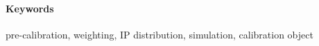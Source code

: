 \documentclass[a4paper, twocolumn, oneside]{article}
\title{\mytitle}
\author{John-John Markstedt}
\begin{document}
    \onecolumn
    \maketitle
    
    \vspace{-.1cm}
    \paragraph{Keywords}
    pre-calibration, weighting, IP distribution, simulation, calibration object

    \vspace{-.4cm}

    \newpage

    \setcounter{secnumdepth}{2}
    \setcounter{tocdepth}{2}
    \tableofcontents
    \thispagestyle{empty}
    \newpage
    \setcounter{page}{1}
    \setcounter{section}{0}

    \twocolumn

    

    \clearpage

    
    

\end{document}
